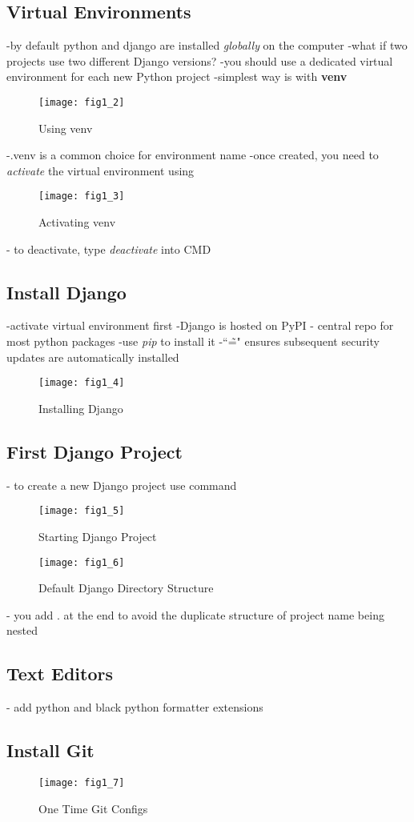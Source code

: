 \documentclass{article}
\begin{document}
\subsection{Virtual Environments}
-by default python and django are installed \textit{globally} on the computer
-what if two projects use two different Django versions?
-you should use a dedicated virtual environment for each new Python project
-simplest way is with \textbf{venv}
\begin{figure}[H]
	\centering
	\texttt{[image: fig1\_2]}
	\caption {Using venv}
\end{figure}
-.venv is a common choice for environment name
-once created, you need to \textit{activate} the virtual environment using
\begin{figure}[H]
	\centering
	\texttt{[image: fig1\_3]}
	\caption {Activating venv}
\end{figure}
- to deactivate, type \textit{deactivate} into CMD


\subsection{Install Django}

-activate virtual environment first
-Django is hosted on PyPI - central repo for most python packages
-use \textit{pip} to install it 
-``\~=" ensures subsequent security updates are automatically installed
\begin{figure}[H]
	\centering
	\texttt{[image: fig1\_4]}
	\caption {Installing Django}
\end{figure}



\subsection{First Django Project}
- to create a new Django project use command
\begin{figure}[H]
	\centering
	\texttt{[image: fig1\_5]}
	\caption {Starting Django Project}
\end{figure}

\begin{figure}[H]
	\centering
	\texttt{[image: fig1\_6]}
	\caption {Default Django Directory Structure}
\end{figure}

- you add . at the end to avoid the duplicate structure of project name being nested

\subsection{Text Editors}
- add python and black python formatter extensions


\subsection{Install Git}
\begin{figure}[H]
	\centering
	\texttt{[image: fig1\_7]}
	\caption {One Time Git Configs}
\end{figure}

\fi
\end{document}

